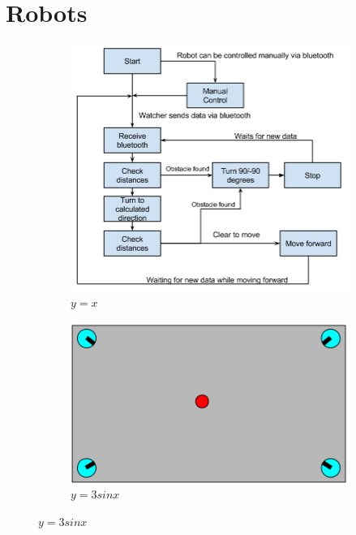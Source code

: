 \section{Robots}
\label{sec:robot}
\begin{figure}
    \centering
    \begin{subfigure}[b]{0.3\textwidth}
        \centering
        \includegraphics[width=\textwidth]{figs/robotschema.png}
        \caption{$y=x$}
        \label{fig:y equals x}
    \end{subfigure}
    \hfill
    \begin{subfigure}[b]{0.3\textwidth}
        \centering
        \includegraphics[width=\textwidth]{figs/scenario0.png}
        \caption{$y=3sinx$}
        \label{fig:three sin x}
    \end{subfigure}

\end{figure}
